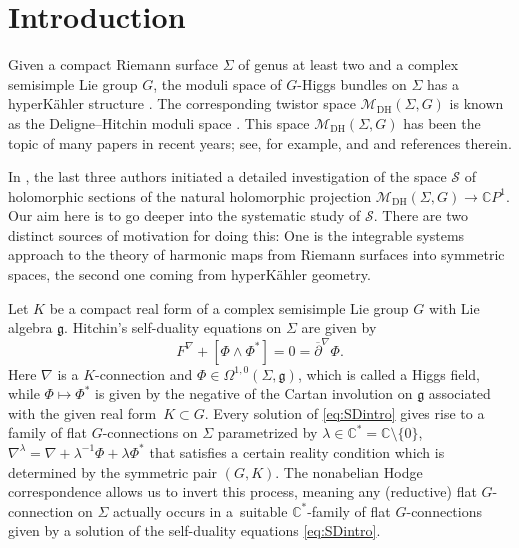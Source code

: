 \documentclass[pdftex]{sigma}
\numberwithin{equation}{section}
\theoremstyle{definition}
\newcommand\C{{\mathbb C}}
\begin{document}

\section{Introduction}

Given a compact Riemann surface $\Sigma$ of genus at least two and a complex semisimple Lie group $G$, the moduli
space of $G$-Higgs bundles on $\Sigma$ has a hyperK\"ahler structure \cite{Hitchin87}. The corresponding twistor
space $\mathcal{M}_{\mathrm{DH}}(\Sigma, G)$ is known as the Deligne--Hitchin moduli space \cite{Si-Hodge}. This space $\mathcal{M}_{\mathrm{DH}}(\Sigma, G)$ has been the topic of many papers in recent years; see, for example, \cite{CollierWentworth,DFKMMN,DM,HuHuang,Huang} and \cite{BeHeRo,BH,BHR,HelHel,Hel} and references therein.

In \cite{BHR}, the last three
authors initiated a detailed investigation of the space $\mathcal S$ of holomorphic
sections of the natural holomorphic projection $\mathcal{M}_{\mathrm{DH}}(\Sigma, G) \longrightarrow \C P^1$. Our aim here is
to go deeper into the systematic study of $\mathcal S$. There are two distinct sources
of motivation for doing this: One is the integrable systems approach to the theory of harmonic maps
from Riemann surfaces into symmetric spaces, the second one coming from hyperK\"ahler geometry.

Let $K$ be a compact real form of a complex semisimple Lie group
$G$ with Lie algebra $\mathfrak{g}$. Hitchin's self-duality equations on $\Sigma$ are given by~\cite{Hitchin87}
\begin{equation}\label{eq:SDintro}
F^\nabla + [\Phi\wedge\Phi^*] = 0 = {\overline{\partial}}^\nabla\Phi.
\end{equation}
Here $\nabla$ is a $K$-connection and $\Phi \in \Omega^{1,0}(\Sigma, \mathfrak{g})$, which is called a Higgs
field, while $\Phi \longmapsto \Phi^*$ is given by the negative of the Cartan involution
on $\mathfrak{g}$ associated with the given real form~${K \subset G}$. Every solution of \eqref{eq:SDintro} gives rise to a family of flat $G$-connections
on $\Sigma$ parametrized by $\lambda\in \C^* = \C \setminus\{0\}$, $
\nabla^\lambda = \nabla + \lambda^{-1}\Phi + \lambda\Phi^*
$
that satisfies a certain reality condition which is determined by the symmetric pair $(G, K)$.
The nonabelian Hodge correspondence \cite{Corlette,Don,Hitchin87, SimpsonIHES1992} allows us to invert
this process, meaning any (reductive) flat $G$-connection on $\Sigma$ actually
occurs in a~suitable $\C^*$-family of flat $G$-connections
given by a solution of the self-duality equations \eqref{eq:SDintro}.
\end{document}
